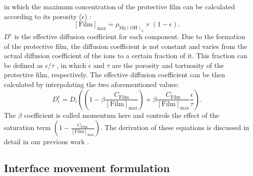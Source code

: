 in which the maximum concentration of the protective film can be calculated according to its porosity ($\epsilon$) \cite{Bajger2016}:
\begin{equation} \label{eq:film_max}
[\mathrm{Film}]_{\max }=\rho_{\mathrm{Mg}(\mathrm{OH})_{2}} \times(1-\epsilon).
\end{equation}
$D^e$ is the effective diffusion coefficient for each component. Due to the formation of the protective film, the diffusion coefficient is not constant and varies from the actual diffusion coefficient of the ions to a certain fraction of it. This fraction can be defined as ${\epsilon}/{\tau}$ \cite{Grathwohl1998,Hoeche2014}, in which $\epsilon$ and $\tau$ are the porosity and tortuosity of the protective film, respectively. The effective diffusion coefficient can be then calculated by interpolating the two aforementioned values:
\begin{equation} \label{eq:diff_coeff}
D_{i}^{e}=D_{i}\left(\left(1-\beta \frac{C_{\mathrm{Film}}}{[\mathrm{Film}]_{\max }}\right)+\beta \frac{C_{\mathrm{Film}}}{[\mathrm{Film}]_{\max }} \frac{\epsilon}{\tau}\right).
\end{equation}
The $\beta$ coefficient is called momentum here and controls the effect of the saturation term $(1-\frac{C_{\mathrm{Film}}}{[\mathrm{Film}]_{\max }})$. The derivation of these equations is discussed in detail in our previous work \cite{Barzegari2020arXiv}.

\subsection{Interface movement formulation}

